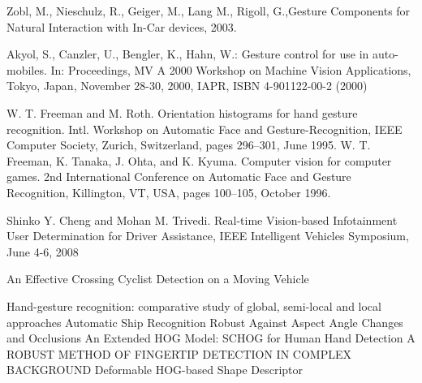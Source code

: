 \documentclass[a4paper,11pt,oneside]{book}
\begin{document}
\begin{thebibliography}{2}

 Zobl, M., Nieschulz, R., Geiger, M., Lang M., Rigoll, G.,{Gesture Components for Natural Interaction with In-Car devices}, 2003.

 Akyol, S., Canzler, U., Bengler, K., Hahn, W.: Gesture control for use in auto-mobiles. In: Proceedings, MV A 2000 Workshop on Machine Vision Applications, Tokyo, Japan, November 28-30, 2000, IAPR, ISBN 4-901122-00-2 (2000)

 W. T. Freeman and M. Roth. Orientation histograms for hand gesture recognition. Intl. Workshop on Automatic Face and Gesture-Recognition, IEEE Computer Society, Zurich, Switzerland, pages 296–301, June 1995.
 W. T. Freeman, K. Tanaka, J. Ohta, and K. Kyuma. Computer vision for computer games. 2nd International Conference on Automatic Face and Gesture Recognition, Killington, VT, USA, pages 100–105, October 1996.

 Shinko Y. Cheng and Mohan M. Trivedi. Real-time Vision-based Infotainment User Determination for Driver Assistance, IEEE Intelligent Vehicles Symposium, June 4-6, 2008

 An Effective Crossing Cyclist Detection on a Moving Vehicle

 Hand-gesture recognition: comparative study of global, semi-local and local approaches
 Automatic Ship Recognition Robust Against Aspect Angle Changes and Occlusions
 An Extended HOG Model: SCHOG for Human Hand Detection
 A ROBUST METHOD OF FINGERTIP DETECTION IN COMPLEX BACKGROUND
 Deformable HOG-based Shape Descriptor


\end{thebibliography}
\end{document}
